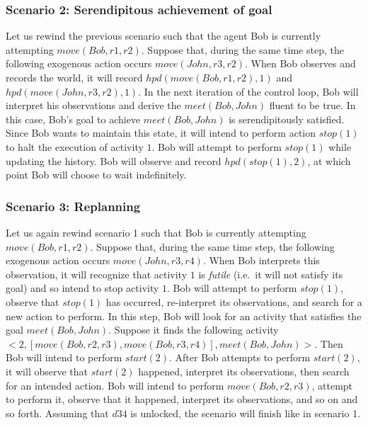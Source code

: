 \subsubsection{Scenario 2: Serendipitous achievement of goal~\citep{blount_towards_2014}}
\label{subsubsec:aia_scenario_2}

Let us rewind the previous scenario such that the agent Bob is currently attempting $move(Bob, r1, r2)$.
Suppose that, during the same time step, the following exogenous action occurs $move(John, r3, r2)$.
When Bob observes and records the world, it will record $hpd(move(Bob, r1, r2), 1)$ and $hpd(move(John,r3,r2), 1)$.
In the next iteration of the control loop, Bob will interpret his observations and derive the $meet(Bob, John)$ fluent to be true.
In this case, Bob's goal to achieve $meet(Bob, John)$ is serendipitously satisfied.
Since Bob wants to maintain this state, it will intend to perform action $stop(1)$ to halt the execution of activity $1$.
Bob will attempt to perform $stop(1)$ while updating the history.
Bob will observe and record $hpd(stop(1), 2)$, at which point Bob will choose to wait indefinitely.

\subsubsection{Scenario 3: Replanning~\citep{blount_towards_2014}}
\label{subsubsec:aia_scenario_3}

Let us again rewind scenario 1 such that Bob is currently attempting $move(Bob, r1, r2)$.
Suppose that, during the same time step, the following exogenous action occurs $move(John, r3, r4)$.
When Bob interprets this observation, it will recognize that activity $1$ is \textit{futile} (i.e.~it will not satisfy its goal) and so intend to stop activity $1$.
Bob will attempt to perform $stop(1)$, observe that $stop(1)$ has occurred, re-interpret its observations, and search for a new action to perform.
In this step, Bob will look for an activity that satisfies the goal $meet(Bob, John)$.
Suppose it finds the following activity $<2, [move(Bob, r2,r3), move(Bob, r3,r4)],meet(Bob,John)>$.
Then Bob will intend to perform $start(2)$.
After Bob attempts to perform $start(2)$, it will observe that $start(2)$ happened, interpret its observations, then search for an intended action.
Bob will intend to perform $move(Bob, r2,r3)$, attempt to perform it, observe that it happened, interpret its observations, and so on and so forth.
Assuming that $d34$ is unlocked, the scenario will finish like in scenario 1.

